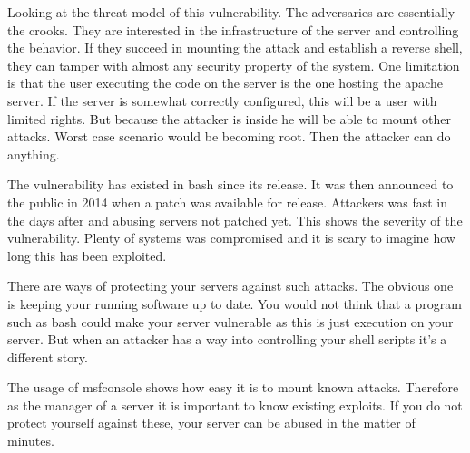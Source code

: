 Looking at the threat model of this vulnerability. The adversaries are essentially the crooks. They are interested in the infrastructure of the server and controlling the behavior. If they succeed in mounting the attack and establish a reverse shell, they can tamper with almost any security property of the system. One limitation is that the user executing the code on the server is the one hosting the apache server. If the server is somewhat correctly configured, this will be a user with limited rights. But because the attacker is inside he will be able to mount other attacks. Worst case scenario would be becoming root. Then the attacker can do anything.

The vulnerability has existed in bash since its release. It was then announced to the public in 2014 when a patch was available for release\cite{shellshock}. Attackers was fast in the days after and abusing servers not patched yet. This shows the severity of the vulnerability. Plenty of systems was compromised and it is scary to imagine how long this has been exploited. 

There are ways of protecting your servers against such attacks. The obvious one is keeping your running software up to date. You would not think that a program such as bash could make your server vulnerable as this is just execution on your server. But when an attacker has a way into controlling your shell scripts it's a different story. 

The usage of msfconsole shows how easy it is to mount known attacks. Therefore as the manager of a server it is important to know existing exploits. If you do not protect yourself against these, your server can be abused in the matter of minutes. 

